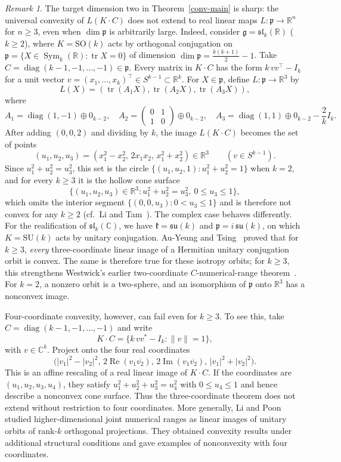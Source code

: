 \documentclass[11pt,reqno]{amsart}
\theoremstyle{remark}
\newtheorem{remark}[theorem]{Remark}
\newcommand{\R}{\mathbb R}
\newcommand{\C}{\mathbb C}
\newcommand{\gfr}{\mathfrak g}
\newcommand{\kfr}{\mathfrak k}
\newcommand{\pfr}{\mathfrak p}
\DeclareMathOperator{\Sym}{Sym}
\DeclareMathOperator{\diag}{diag}
\DeclareMathOperator{\tr}{tr}
\begin{document}
\begin{remark}\label{conv-higher-dim}
The target dimension two in Theorem~\ref{conv-main} is sharp: the
universal convexity of $L(K\cdot C)$ does not extend to real linear maps
$L:\pfr\to\R^n$ for $n\ge3$, even when $\dim\pfr$ is arbitrarily large.
Indeed, consider $\gfr=\mathfrak{sl}_k(\R)$ ($k\ge2$), where
$K=\mathrm{SO}(k)$ acts by orthogonal conjugation on
$\pfr=\{X\in\Sym_k(\R):\tr X=0\}$ of dimension
$\dim\pfr=\frac{k(k+1)}{2}-1$. Take
$C=\diag(k-1,-1,\ldots,-1)\in\pfr$. Every matrix in $K\cdot C$ has the
form $k\,vv^{\top}-I_k$ for a unit vector
$v=(x_1,\ldots,x_k)^{\top}\in S^{k-1}\subset\R^k$. For $X\in\pfr$, define
$L:\pfr\to\R^3$ by 
\[L(X)=(\tr(A_1X),\tr(A_2X),\tr(A_3X)),
\] where
\[
 A_1=\diag(1,-1)\oplus 0_{k-2},\quad
 A_2=\begin{pmatrix}0&1\\1&0\end{pmatrix}\oplus 0_{k-2},\quad
 A_3=\diag(1,1)\oplus 0_{k-2}-\frac{2}{k}I_k.
\]
After adding $(0,0,2)$ and dividing by $k$, the image $L(K\cdot C)$
becomes the set of points
\[
 (u_1,u_2,u_3)=(x_1^2-x_2^2,\,2x_1x_2,\,x_1^2+x_2^2)\in\R^3
 \qquad(v\in S^{k-1}).
\]
Since $u_1^2+u_2^2=u_3^2$, this set is the circle
$\{(u_1,u_2,1):u_1^2+u_2^2=1\}$ when $k=2$, and for every $k\ge3$ it is
the hollow cone surface
\[
 \{(u_1,u_2,u_3)\in\R^3:u_1^2+u_2^2=u_3^2,\ 0\le u_3\le1\},
\]
which omits the interior segment $\{(0,0,u_3):0<u_3\le1\}$ and is
therefore not convex for any $k\ge2$ (cf.~Li and
Tam~\cite[Theorem~4.1, page~150]{LiTam2000}). The complex case behaves differently. For the realification of
$\mathfrak{sl}_k(\C)$, we have $\kfr=\mathfrak{su}(k)$ and
$\pfr=i\,\mathfrak{su}(k)$, on which $K=\mathrm{SU}(k)$ acts by unitary
conjugation. Au-Yeung and Tsing~\cite{AuYeungTsing1983} proved that for
$k\ge3$, \emph{every} three-coordinate linear image of a Hermitian
unitary conjugation orbit is convex. The same is therefore true for
these isotropy orbits; for $k\ge3$, this strengthens Westwick's earlier two-coordinate
$C$-numerical-range theorem~\cite{Westwick1975}. For $k=2$,
a nonzero orbit is a two-sphere, and an isomorphism of $\pfr$ onto
$\R^3$ has a nonconvex image.

Four-coordinate convexity, however, can fail even for $k\ge3$. To see
this, take $C=\diag(k-1,-1,\ldots,-1)$ and write
\[
K\cdot C=\{k\,vv^*-I_k:\|v\|=1\},
\]
 with $v\in\C^k$. Project onto the
four real coordinates
\[
 \bigl(|v_1|^2-|v_2|^2,\,
 2\operatorname{Re}(v_1\overline{v_2}),\,
 2\operatorname{Im}(v_1\overline{v_2}),\,
 |v_1|^2+|v_2|^2\bigr).
\]
This is an affine rescaling of a real linear image of $K\cdot C$. If
the coordinates are $(u_1,u_2,u_3,u_4)$, they satisfy
$u_1^2+u_2^2+u_3^2=u_4^2$ with $0\le u_4\le1$ and hence describe a
nonconvex cone surface. Thus the three-coordinate theorem does not
extend without restriction to four coordinates. More generally,
Li and Poon~\cite{LiPoon2000} studied higher-dimensional joint numerical
ranges as linear images of unitary orbits of rank-$k$ orthogonal
projections. They obtained convexity results under additional
structural conditions and gave examples of nonconvexity with four
coordinates.


\end{remark}
\end{document}
